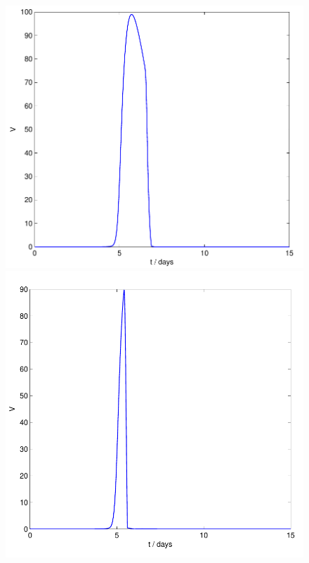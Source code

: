 \documentclass[a4paper, 12pt]{report}
\begin{document}
\begin{figure}[h!]
\begin{minipage}{0.5\textwidth}
\includegraphics[height = 0.3\textheight]{drug_t0_6p5_scissored} %
\end{minipage}
\begin{minipage}{0.5\textwidth}
\includegraphics[height = 0.32\textheight]{drug_t0_5p4_scissored} %
\end{minipage}


\end{figure}
\end{document}

